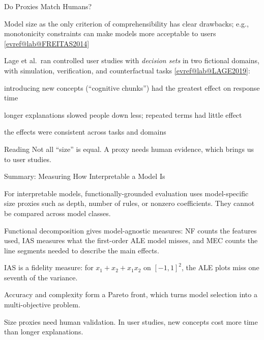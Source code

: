\documentclass[10pt,compress,t,notes=noshow,xcolor=table]{beamer}
\makeatletter
\newcommand{\spacer}[1][1]{\vspace{#1\baselineskip}}
\newcommand{\citeref}[1]{%
  \href{\csname evref@url@#1\endcsname}{[\csname evref@lab@#1\endcsname]}}
\makeatother
\begin{document}
\begin{framev}[align=top]{Do Proxies Match Humans?}
\begin{itemizeM}
\item Model size as the only criterion of comprehensibility has clear drawbacks; e.g., monotonicity constraints can make models more acceptable to users \citeref{FREITAS2014}
\item Lage et al.\ ran controlled user studies with \emph{decision sets} in two fictional domains, with simulation, verification, and counterfactual tasks \citeref{LAGE2019}:
  \begin{itemizeS}
  \item introducing new concepts (``cognitive chunks'') had the greatest effect on response time
  \item longer explanations slowed people down less; repeated terms had little effect
  \item the effects were consistent across tasks and domains
  \end{itemizeS}
\end{itemizeM}
\pause
\spacer[0.4]
\begin{block}{Reading}
Not all ``size'' is equal. A proxy needs human evidence, which brings us to user studies.
\end{block}
\end{framev}


\begin{framev}[align=top]{Summary: Measuring How Interpretable a Model Is}
\begin{itemizeM}
\item For interpretable models, functionally-grounded evaluation uses model-specific size proxies such as depth, number of rules, or nonzero coefficients. They cannot be compared across model classes.
\item Functional decomposition gives model-agnostic measures: NF counts the features used, IAS measures what the first-order ALE model misses, and MEC counts the line segments needed to describe the main effects.
\item IAS is a fidelity measure: for $x_1 + x_2 + x_1x_2$ on $[-1,1]^2$, the ALE plots miss one seventh of the variance.
\item Accuracy and complexity form a Pareto front, which turns model selection into a multi-objective problem.
\item Size proxies need human validation. In user studies, new concepts cost more time than longer explanations.
\end{itemizeM}
\end{framev}
\end{document}
